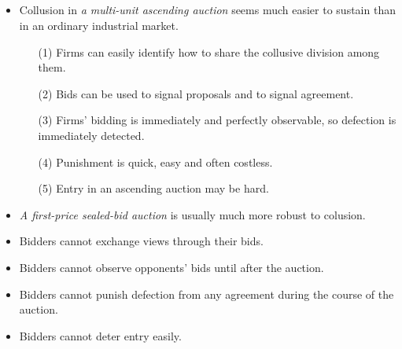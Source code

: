 \documentclass[uplatex,14pt,dvipdfmx,xcolor=svgnames]{beamer}
\begin{document}
\subsection{\ssecIIIb}
\begin{frame}[t]{\ssecIIIb}
	
\begin{itemize}
	\item Collusion in \emph{a multi-unit ascending auction} seems much easier to sustain than in an ordinary industrial market.
	\begin{itemize}
		\item[(1)] Firms can easily identify how to share the collusive division among them.
		\item[(2)] Bids can be used to signal proposals and to signal agreement.
		\item[(3)] Firms' bidding is immediately and perfectly observable, so defection is immediately detected.
		\item[(4)] Punishment is quick, easy and often costless.
		\item[(5)] Entry in an ascending auction may be hard.
	\end{itemize}
\end{itemize}

	
\end{frame}

\begin{frame}[t]{\ssecIIIb}
	
	\begin{itemize}
		\item \emph{A first-price sealed-bid auction} is usually much more robust to colusion.
		\item Bidders cannot exchange views through their bids.
		\item Bidders cannot observe opponents' bids until after the auction.
		\item Bidders cannot punish defection from any agreement during the course of the auction.
		\item Bidders cannot deter entry easily.
	\end{itemize}
	
	
	
\end{frame}

\newcommand{\secVI}{4.4 Robustness to Poritical Pressures}
\end{document}
